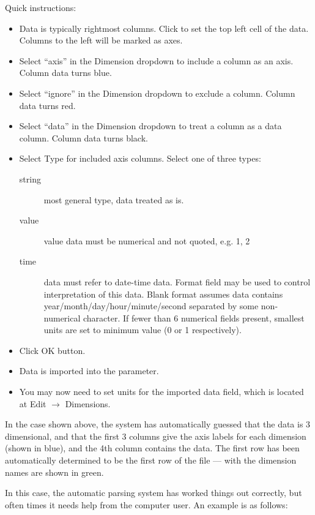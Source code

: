 Quick instructions:
\begin{itemize}
\item Data is typically rightmost columns. Click to set the top left
  cell of the data. Columns to the left will be marked as axes.
\item Select ``axis'' in the Dimension dropdown to include a column as
  an axis. Column data turns blue.
\item Select ``ignore'' in the Dimension dropdown to exclude a
  column. Column data turns red.
\item Select ``data'' in the Dimension dropdown to treat a column as a
  data column. Column data turns black.
\item Select Type for included axis columns. Select one of three
  types:
  \begin{description}
  \item[string] most general type, data treated as is.
  \item[value] value data must be numerical and not quoted, e.g. 1, 2
  \item[time] data must refer to date-time data. Format field may be
    used to control interpretation of this data. Blank format assumes
    data contains year/month/day/hour/minute/second separated by some
    non-numerical character. If fewer than 6 numerical fields present,
    smallest units are set to minimum value (0 or 1 respectively).
  \end{description}
\item Click OK button.
\item Data is imported into the parameter.
\item You may now need to set units for the imported data field, which
  is located at Edit $\rightarrow$ Dimensions.
\end{itemize}

In the case shown above, the system has automatically guessed that the
data is 3 dimensional, and that the first 3 columns give the axis
labels for each dimension (shown in blue), and the 4th column contains
the data. The first row has been automatically determined to be the
first row of the file --- with the dimension names are shown in green.

In this case, the automatic parsing system has worked things out
correctly, but often times it needs help from the computer user. An
example is as follows:

\begin{center}
\end{center}

